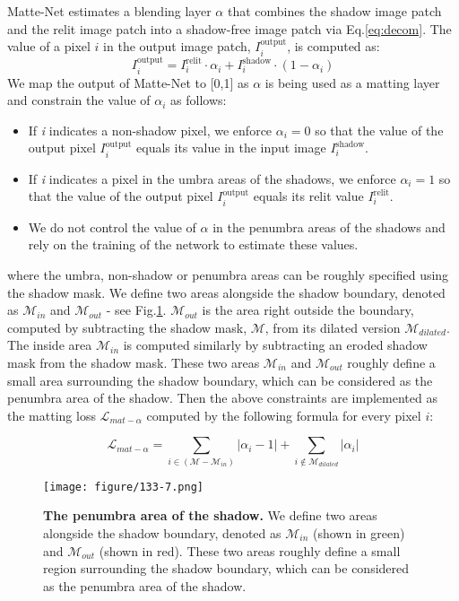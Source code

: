 \documentclass[runningheads]{llncs}
\def\mM{\mathcal{M}}
\begin{document}
Matte-Net estimates a blending layer $\alpha$ that combines the shadow image patch and the relit image patch into a shadow-free image patch via Eq.\ref{eq:decom}. The value of a pixel $i$ in the output image patch, $I_i^{\textrm{output}}$, is computed as:  
\begin{equation}
I_i^{\textrm{output}} =  I_i^{\textrm{relit}}\cdot \alpha_i+ I_i^{\textrm{shadow}} \cdot (1-\alpha_i )
\end{equation}
We map the output of Matte-Net to [0,1] as $\alpha$ is being used as a matting layer and constrain the value of $\alpha_i$ as follows:
\begin{itemize}
    \item If \textit{i} indicates a non-shadow pixel, we enforce $\alpha_i=0$ so that the value of the output pixel $I_i^{\textrm{output}}$ equals its value in the input image $I_i^{\textrm{shadow}}$.
    \item If \textit{i} indicates a pixel in the umbra areas of the shadows, we enforce $\alpha_i=1$ so that the value of the output pixel $I_i^{\textrm{output}}$ equals its relit value $I_i^{\textrm{relit}}$.
    \item We do not control the value of $\alpha$ in the penumbra areas of the shadows and rely on the training of the network to estimate these values.
\end{itemize}

\noindent where the umbra, non-shadow or penumbra areas can be roughly specified using the shadow mask. We define two areas alongside the shadow boundary, denoted as $\mM_{in}$ and $\mM_{out}$ - see Fig.\ref{fig:boundary}. $\mM_{out}$ is the area right outside the boundary, computed by subtracting the shadow mask, $\mM$, from its dilated version $\mM_{dilated}$. The inside area $\mM_{in}$ is computed similarly by subtracting an eroded shadow mask from the shadow mask. 
These two areas $\mM_{in}$ and $\mM_{out}$ roughly define a small area surrounding the shadow boundary, which can be considered as the penumbra area of the shadow. Then the above constraints are implemented as the matting loss $\mathcal{L}_{mat-\alpha} $ computed by the following formula for every pixel $i$:

\begin{equation}
\mathcal{L}_{mat-\alpha} = \sum_{i\in (\mM - \mM_{in})} |\alpha_i-1| +  \sum_{i\notin \mM_{dilated}} |\alpha_i|
\end{equation}


\def\subboxsize{0.31\textwidth}
\begin{figure}[t!]
	\centering
  \texttt{[image: figure/133-7.png]}
    \makebox[\subboxsize]{Input Image}
    \makebox[\subboxsize]{Shadow Mask}
    \makebox[\subboxsize]{$\mM_{in}$ (green) \& $\mM_{out}$ (red)}

  \caption{\textbf{The penumbra area of the shadow.} We define two areas alongside the shadow boundary, denoted as $\mM_{in}$ (shown in green) and $\mM_{out}$ (shown in red). These two areas roughly define a small region surrounding the shadow boundary, which can be considered as the penumbra area of the shadow. }
  \label{fig:boundary}

\end{figure}
\end{document}
